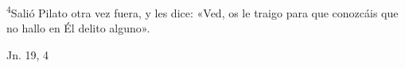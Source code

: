 \documentclass[../../rosario.tex]{subfiles}
\begin{document}
    \textsuperscript{4}Salió Pilato otra vez fuera, y les dice: «Ved, os le traigo para que conozcáis que no hallo en Él delito alguno».
    \begin{flushright}
    Jn. 19, 4
    \end{flushright}
\end{document}
